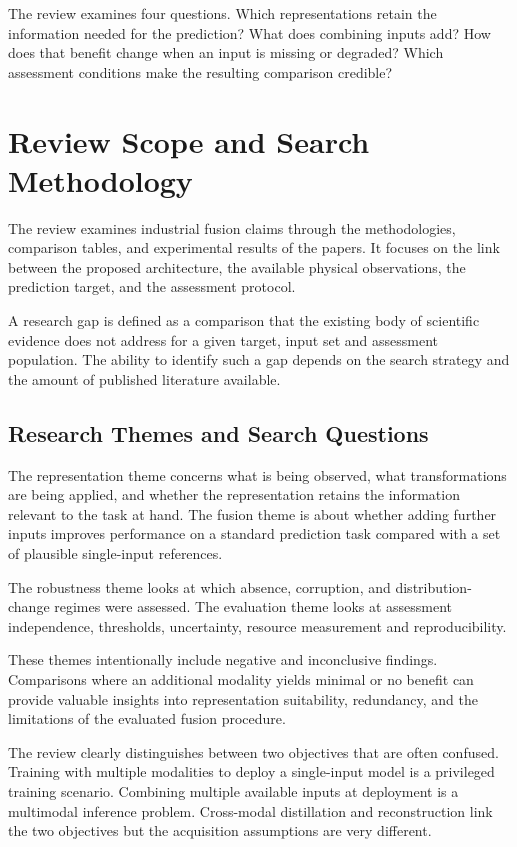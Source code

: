The review examines four questions. Which representations retain the information needed for the prediction? What does combining inputs add? How does that benefit change when an input is missing or degraded? Which assessment conditions make the resulting comparison credible?

\section{Review Scope and Search Methodology}

The review examines industrial fusion claims through the methodologies, comparison tables, and
experimental results of the papers. It focuses on the link between the proposed architecture, the
available physical observations, the prediction target, and the assessment protocol.

A research gap is defined as a comparison that the existing body of scientific evidence does not
address for a given target, input set and assessment population. The ability to identify such a gap
depends on the search strategy and the amount of published literature available.

\subsection{Research Themes and Search Questions}

The representation theme concerns what is being observed, what transformations are being applied,
and whether the representation retains the information relevant to the task at hand. The fusion
theme is about whether adding further inputs improves performance on a standard prediction task
compared with a set of plausible single-input references.

The robustness theme looks at which absence, corruption, and distribution-change regimes were
assessed. The evaluation theme looks at assessment independence, thresholds, uncertainty, resource
measurement and reproducibility.

These themes intentionally include negative and inconclusive findings. Comparisons where an
additional modality yields minimal or no benefit can provide valuable insights into representation
suitability, redundancy, and the limitations of the evaluated fusion procedure.

The review clearly distinguishes between two objectives that are often confused. Training with
multiple modalities to deploy a single-input model is a privileged training scenario. Combining
multiple available inputs at deployment is a multimodal inference problem. Cross-modal distillation
and reconstruction link the two objectives but the acquisition assumptions are very different.

